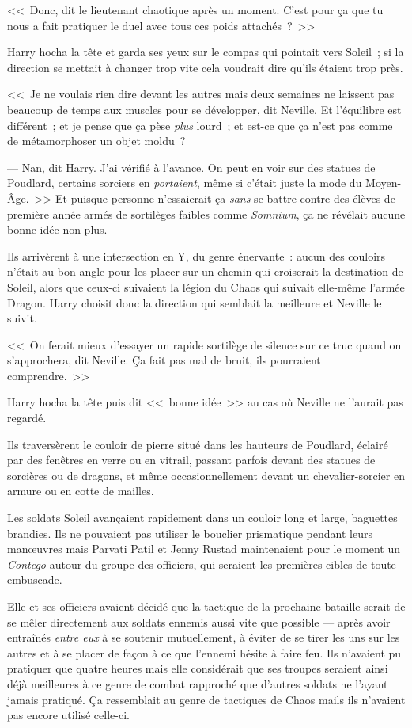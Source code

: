 <<~Donc, dit le lieutenant chaotique après un moment. C'est pour ça que tu nous a fait pratiquer le duel avec tous ces poids attachés~?~>>

Harry hocha la tête et garda ses yeux sur le compas qui pointait vers Soleil~; si la direction se mettait à changer trop vite cela voudrait dire qu'ils étaient trop près.

<<~Je ne voulais rien dire devant les autres mais deux semaines ne laissent pas beaucoup de temps aux muscles pour se développer, dit Neville. Et l'équilibre est différent~; et je pense que ça pèse \emph{plus} lourd~; et est-ce que ça n'est pas comme de métamorphoser un objet moldu~?

--- Nan, dit Harry. J'ai vérifié à l'avance. On peut en voir sur des statues de Poudlard, certains sorciers en \emph{portaient}, même si c'était juste la mode du Moyen-Âge.~>> Et puisque personne n'essaierait ça \emph{sans} se battre contre des élèves de première année armés de sortilèges faibles comme \emph{Somnium}, ça ne révélait aucune bonne idée non plus.

Ils arrivèrent à une intersection en Y, du genre énervante~: aucun des couloirs n'était au bon angle pour les placer sur un chemin qui croiserait la destination de Soleil, alors que ceux-ci suivaient la légion du Chaos qui suivait elle-même l'armée Dragon. Harry choisit donc la direction qui semblait la meilleure et Neville le suivit.

<<~On ferait mieux d'essayer un rapide sortilège de silence sur ce truc quand on s'approchera, dit Neville. Ça fait pas mal de bruit, ils pourraient comprendre.~>>

Harry hocha la tête puis dit <<~bonne idée~>> au cas où Neville ne l'aurait pas regardé.

Ils traversèrent le couloir de pierre situé dans les hauteurs de Poudlard, éclairé par des fenêtres en verre ou en vitrail, passant parfois devant des statues de sorcières ou de dragons, et même occasionnellement devant un chevalier-sorcier en armure ou en cotte de mailles.

\later

Les soldats Soleil avançaient rapidement dans un couloir long et large, baguettes brandies. Ils ne pouvaient pas utiliser le bouclier prismatique pendant leurs manœuvres mais Parvati Patil et Jenny Rustad maintenaient pour le moment un \emph{Contego} autour du groupe des officiers, qui seraient les premières cibles de toute embuscade.

Elle et ses officiers avaient décidé que la tactique de la prochaine bataille serait de se mêler directement aux soldats ennemis aussi vite que possible — après avoir entraînés \emph{entre eux} à se soutenir mutuellement, à éviter de se tirer les uns sur les autres et à se placer de façon à ce que l'ennemi hésite à faire feu. Ils n'avaient pu pratiquer que quatre heures mais elle considérait que ses troupes seraient ainsi déjà meilleures à ce genre de combat rapproché que d'autres soldats ne l'ayant jamais pratiqué. Ça ressemblait au genre de tactiques de Chaos mails ils n'avaient pas encore utilisé celle-ci.


